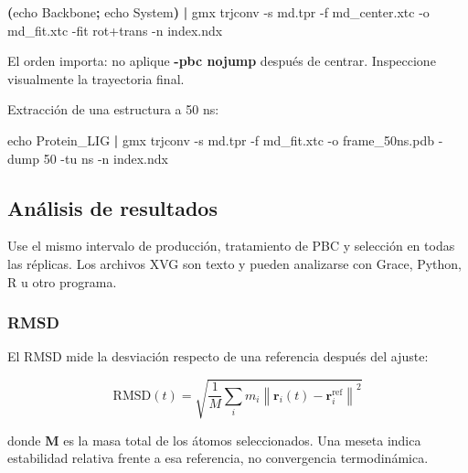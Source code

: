 \documentclass[
  spanish,
  11pt,
  a4paper]{article}
\newenvironment{Shaded}{\begin{snugshade}}{\end{snugshade}}
\newcommand{\AttributeTok}[1]{\textcolor[rgb]{0.13,0.29,0.53}{#1}}
\newcommand{\BuiltInTok}[1]{#1}
\newcommand{\ExtensionTok}[1]{#1}
\newcommand{\KeywordTok}[1]{\textcolor[rgb]{0.13,0.29,0.53}{\textbf{#1}}}
\newcommand{\NormalTok}[1]{#1}
\begin{document}
\begin{Shaded}
\begin{Highlighting}[]
\KeywordTok{(}\BuiltInTok{echo}\NormalTok{ Backbone}\KeywordTok{;} \BuiltInTok{echo}\NormalTok{ System}\KeywordTok{)} \KeywordTok{|}
\ExtensionTok{gmx}\NormalTok{ trjconv     }\AttributeTok{{-}s}\NormalTok{ md.tpr     }\AttributeTok{{-}f}\NormalTok{ md\_center.xtc     }\AttributeTok{{-}o}\NormalTok{ md\_fit.xtc     }\AttributeTok{{-}fit}\NormalTok{ rot+trans     }\AttributeTok{{-}n}\NormalTok{ index.ndx}
\end{Highlighting}
\end{Shaded}

El orden importa: no aplique \textbf{-pbc nojump} después de centrar.
Inspeccione visualmente la trayectoria final.

Extracción de una estructura a 50 ns:

\begin{Shaded}
\begin{Highlighting}[]
\BuiltInTok{echo}\NormalTok{ Protein\_LIG }\KeywordTok{|}
\ExtensionTok{gmx}\NormalTok{ trjconv     }\AttributeTok{{-}s}\NormalTok{ md.tpr     }\AttributeTok{{-}f}\NormalTok{ md\_fit.xtc     }\AttributeTok{{-}o}\NormalTok{ frame\_50ns.pdb     }\AttributeTok{{-}dump}\NormalTok{ 50     }\AttributeTok{{-}tu}\NormalTok{ ns     }\AttributeTok{{-}n}\NormalTok{ index.ndx}
\end{Highlighting}
\end{Shaded}

\subsection{Análisis de resultados}\label{anuxe1lisis-de-resultados}

Use el mismo intervalo de producción, tratamiento de PBC y selección en
todas las réplicas. Los archivos XVG son texto y pueden analizarse con
Grace, Python, R u otro programa.

\subsubsection{RMSD}\label{rmsd}

El RMSD mide la desviación respecto de una referencia después del
ajuste:

\[
\mathrm{RMSD}(t)=
\sqrt{\frac{1}{M}\sum_i m_i
\left\|\mathbf r_i(t)-\mathbf r_i^{\mathrm{ref}}\right\|^2}
\]

donde \textbf{M} es la masa total de los átomos seleccionados. Una
meseta indica estabilidad relativa frente a esa referencia, no
convergencia termodinámica.
\end{document}
